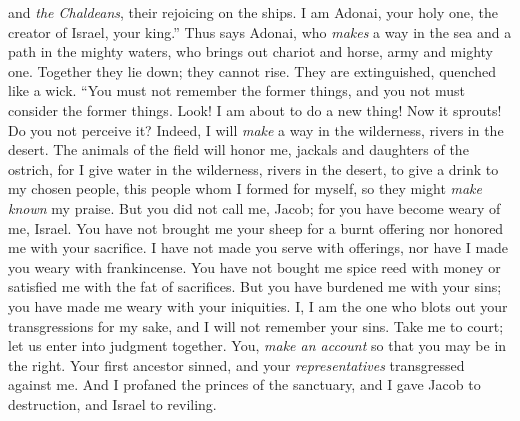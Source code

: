 \begin{biblechapter}
and \textit{the Chaldeans}, their rejoicing on the ships.
\verse I am Adonai, your holy one, 
the creator of Israel, your king.”
\verse Thus says Adonai, who \textit{makes} a way in the sea 
and a path in the mighty waters,
\verse who brings out chariot and horse, 
army and mighty one. 
Together they lie down; 
they cannot rise. 
They are extinguished, 
quenched like a wick.
\verse “You must not remember the former things, 
and you not must consider the former things.
\verse Look! I am about to do a new thing! Now it sprouts! 
Do you not perceive it? 
Indeed, I will \textit{make} a way in the wilderness, 
rivers in the desert.
\verse The animals of the field will honor me, 
jackals and daughters of the ostrich, 
for I give water in the wilderness, 
rivers in the desert, 
to give a drink to my chosen people,
\verse this people whom I formed for myself, 
so they might \textit{make known} my praise.
\verse But you did not call me, Jacob; 
for you have become weary of me, Israel.
\verse You have not brought me your sheep for a burnt offering 
nor honored me with your sacrifice. 
I have not made you serve with offerings, 
nor have I made you weary with frankincense.
\verse You have not bought me spice reed with money 
or satisfied me with the fat of sacrifices. 
But you have burdened me with your sins; 
you have made me weary with your iniquities.
\verse I, I am the one who blots out your transgressions for my sake, 
and I will not remember your sins.
\verse Take me to court; let us enter into judgment together. 
You, \textit{make an account} so that you may be in the right.
\verse Your first ancestor sinned, 
and your \textit{representatives} transgressed against me.
\verse And I profaned the princes of the sanctuary, 
and I gave Jacob to destruction, and Israel to reviling.
\end{biblechapter}

